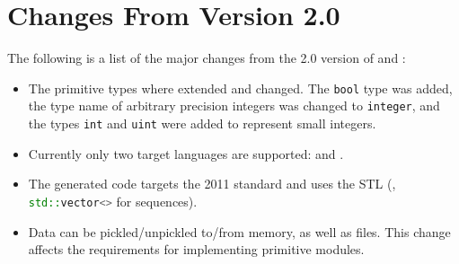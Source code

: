 \section{Changes From Version 2.0}
\label{sec:changes}

The following is a list of the major changes from the 2.0 version of \asdl{}
and \asdlgen{}:
\begin{itemize}
  \item
    The primitive types where extended and changed.
    The \lstinline!bool! type was added, the type name of arbitrary precision integers
    was changed to \lstinline!integer!, and the types \lstinline!int! and \lstinline!uint!
    were added to represent small integers.
  \item
    Currently only two target languages are supported: \sml{} and \Cplusplus{}.
  \item
    The generated \Cplusplus{} code targets the 2011 standard and uses the
    STL (\eg{}, \lstinline[language=C++]!std::vector<>! for \asdl{} sequences).
  \item
    Data can be pickled/unpickled to/from memory, as well as files.
    This change affects the requirements for implementing primitive modules.
\end{itemize}%
